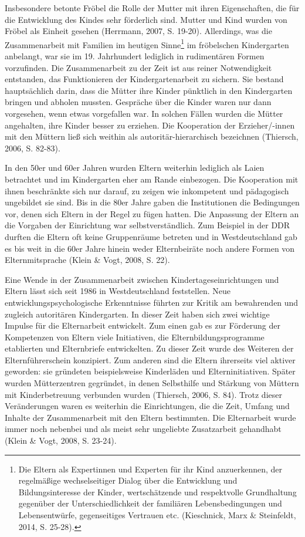 \documentclass[12pt,a4paper]{article}
\begin{document}
Insbesondere betonte Fröbel die Rolle der Mutter mit ihren Eigenschaften, die für die Entwicklung des Kindes sehr förderlich sind. Mutter und Kind wurden von Fröbel als Einheit gesehen (Herrmann, 2007, S. 19-20). Allerdings, was die Zusammenarbeit mit Familien im heutigen Sinne\footnote{Die Eltern als Expertinnen und Experten für ihr Kind anzuerkennen, der regelmäßige wechselseitiger Dialog über die Entwicklung und Bildungsinteresse der Kinder, wertschätzende und respektvolle Grundhaltung gegenüber der Unterschiedlichkeit der familiären Lebensbedingungen und Lebensentwürfe, gegenseitiges Vertrauen etc. (Kieschnick, Marx \& Steinfeldt, 2014, S. 25-28).} im fröbelschen Kindergarten  anbelangt, war sie im 19. Jahrhundert lediglich in rudimentären Formen vorzufinden. Die Zusammenarbeit zu der Zeit ist aus reiner Notwendigkeit entstanden, das Funktionieren der Kindergartenarbeit zu sichern. Sie bestand hauptsächlich darin,  dass die Mütter ihre Kinder pünktlich in den Kindergarten bringen und abholen mussten. Gespräche über die Kinder waren nur dann vorgesehen, wenn etwas vorgefallen war. In solchen Fällen wurden die Mütter angehalten, ihre Kinder besser zu erziehen. Die Kooperation der Erzieher/-innen mit den Müttern ließ sich weithin als autoritär-hierarchisch bezeichnen (Thiersch, 2006, S. 82-83).

	In den 50er und 60er Jahren wurden Eltern weiterhin lediglich als Laien betrachtet und im Kindergarten eher am Rande einbezogen. Die Kooperation mit ihnen beschränkte sich nur darauf, zu zeigen wie inkompetent und pädagogisch ungebildet sie sind. Bis in die 80er Jahre gaben die Institutionen die Bedingungen vor, denen sich Eltern in der Regel zu fügen hatten. Die Anpassung der Eltern an die Vorgaben der Einrichtung war selbstverständlich. Zum Beispiel in der DDR durften die Eltern oft keine Gruppenräume betreten und in Westdeutschland gab es bis weit in die 60er Jahre hinein weder Elternbeiräte noch andere Formen von Elternmitsprache (Klein \& Vogt, 2008, S. 22).
	
	Eine Wende in der Zusammenarbeit zwischen Kindertageseinrichtungen und Eltern lässt sich seit 1986 in Westdeutschland feststellen. Neue entwicklungspsychologische Erkenntnisse führten zur Kritik am bewahrenden und zugleich autoritären Kindergarten. In dieser Zeit haben sich zwei wichtige Impulse für die Elternarbeit entwickelt. Zum einen gab es zur Förderung der Kompetenzen von Eltern viele Initiativen, die Elternbildungsprogramme etablierten und Elternbriefe entwickelten. Zu dieser Zeit wurde des Weiteren der Elternführerschein konzipiert. Zum anderen sind die Eltern ihrerseits viel aktiver geworden: sie gründeten beispielsweise Kinderläden und Elterninitiativen. Später wurden Mütterzentren gegründet, in denen Selbsthilfe und Stärkung von Müttern mit Kinderbetreuung verbunden wurden (Thiersch, 2006, S. 84). Trotz dieser Veränderungen waren es weiterhin die Einrichtungen, die die Zeit, Umfang und Inhalte der Zusammenarbeit mit den Eltern bestimmten. Die Elternarbeit wurde immer noch nebenbei und als meist sehr ungeliebte Zusatzarbeit gehandhabt (Klein \& Vogt, 2008, S. 23-24).
	
\end{document}
